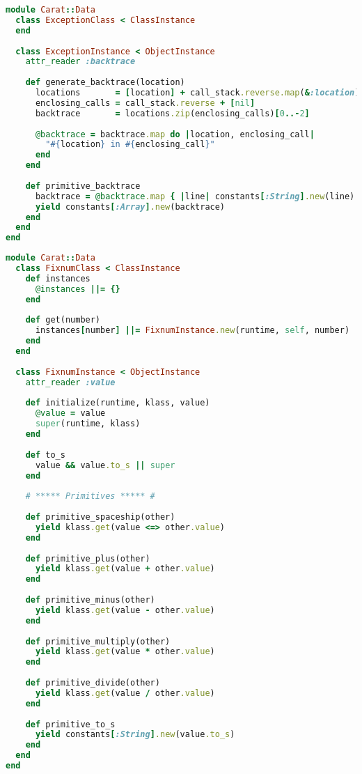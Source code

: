 \begin{lstlisting}[title={\small\ttfamily\bfseries data/exception.rb},language=Ruby]
module Carat::Data
  class ExceptionClass < ClassInstance
  end
  
  class ExceptionInstance < ObjectInstance
    attr_reader :backtrace
    
    def generate_backtrace(location)
      locations       = [location] + call_stack.reverse.map(&:location)
      enclosing_calls = call_stack.reverse + [nil]
      backtrace       = locations.zip(enclosing_calls)[0..-2]
      
      @backtrace = backtrace.map do |location, enclosing_call|
        "#{location} in #{enclosing_call}"
      end
    end
    
    def primitive_backtrace
      backtrace = @backtrace.map { |line| constants[:String].new(line) }
      yield constants[:Array].new(backtrace)
    end
  end
end

\end{lstlisting}
\begin{lstlisting}[title={\small\ttfamily\bfseries data/fixnum.rb},language=Ruby]
module Carat::Data
  class FixnumClass < ClassInstance
    def instances
      @instances ||= {}
    end
    
    def get(number)
      instances[number] ||= FixnumInstance.new(runtime, self, number)
    end
  end
  
  class FixnumInstance < ObjectInstance
    attr_reader :value
    
    def initialize(runtime, klass, value)
      @value = value
      super(runtime, klass)
    end
    
    def to_s
      value && value.to_s || super
    end
    
    # ***** Primitives ***** #
    
    def primitive_spaceship(other)
      yield klass.get(value <=> other.value)
    end
    
    def primitive_plus(other)
      yield klass.get(value + other.value)
    end
    
    def primitive_minus(other)
      yield klass.get(value - other.value)
    end
    
    def primitive_multiply(other)
      yield klass.get(value * other.value)
    end
    
    def primitive_divide(other)
      yield klass.get(value / other.value)
    end
    
    def primitive_to_s
      yield constants[:String].new(value.to_s)
    end
  end
end

\end{lstlisting}
